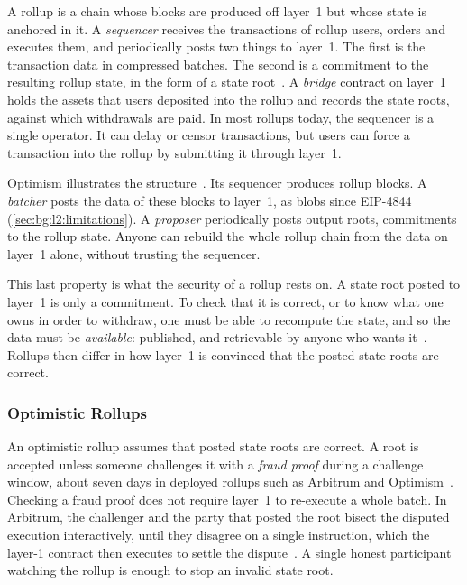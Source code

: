A rollup is a chain whose blocks are produced off layer~1 but whose state is anchored in it.
A \emph{sequencer} receives the transactions of rollup users, orders and executes them, and periodically posts two things to layer~1.
The first is the transaction data in compressed batches.
The second is a commitment to the resulting rollup state, in the form of a state root~\cite{gudgeon2020sok}.
A \emph{bridge} contract on layer~1 holds the assets that users deposited into the rollup and records the state roots, against which withdrawals are paid.
In most rollups today, the sequencer is a single operator.
It can delay or censor transactions, but users can force a transaction into the rollup by submitting it through layer~1.

Optimism illustrates the structure~\cite{optimismspecs}.
Its sequencer produces rollup blocks.
A \emph{batcher} posts the data of these blocks to layer~1, as blobs since EIP-4844 (\autoref{sec:bg:l2:limitations}).
A \emph{proposer} periodically posts output roots, commitments to the rollup state.
Anyone can rebuild the whole rollup chain from the data on layer~1 alone, without trusting the sequencer. 

This last property is what the security of a rollup rests on.
A state root posted to layer~1 is only a commitment.
To check that it is correct, or to know what one owns in order to withdraw, one must be able to recompute the state, and so the data must be \emph{available}: published, and retrievable by anyone who wants it~\cite{albassam2021fraud}.
Rollups then differ in how layer~1 is convinced that the posted state roots are correct.

\subsubsection{Optimistic Rollups}\label{sec:bg:l2:rollups:optimistic}


An optimistic rollup assumes that posted state roots are correct.
A root is accepted unless someone challenges it with a \emph{fraud proof} during a challenge window, about seven days in deployed rollups such as Arbitrum and Optimism~\cite{kalodner2018arbitrum,ethoptimisticrollups}.
Checking a fraud proof does not require layer~1 to re-execute a whole batch.
In Arbitrum, the challenger and the party that posted the root bisect the disputed execution interactively, until they disagree on a single instruction, which the layer-1 contract then executes to settle the dispute~\cite{kalodner2018arbitrum}.
A single honest participant watching the rollup is enough to stop an invalid state root.

